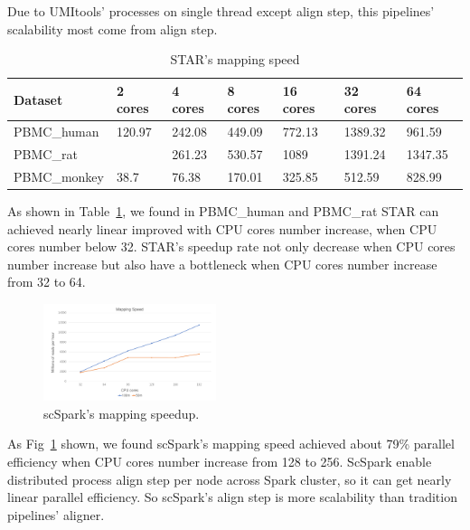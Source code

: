 \documentclass[conference]{IEEEtran}
\begin{document}
Due to UMI\-tools' processes on single thread except align step, this pipelines' scalability most come from align step.
\begin{table}
	\centering
	\caption{STAR's mapping speed}\label{tab3}
	\resizebox{0.45\textwidth}{!} {
	\begin{tabular}{l | l | l | l | l | l | l}
		\hline
		Dataset & 2 cores & 4 cores & 8 cores & 16 cores & 32 cores & 64 cores \\
		\hline
		PBMC\_human & 120.97 & 242.08 & 449.09 & 772.13 & 1389.32 & 961.59 \\
		PBMC\_rat &  & 261.23 & 530.57 & 1089 & 1391.24 & 1347.35 \\
		PBMC\_monkey  & 38.7 & 76.38 & 170.01 & 325.85 & 512.59 & 828.99 \\
		\hline
	\end{tabular} }
\end{table}
As shown in Table~\ref{tab3}, we found in PBMC\_human and PBMC\_rat STAR can achieved nearly linear improved with CPU cores number increase, when CPU cores number below 32.
STAR's speedup rate not only decrease when CPU cores number increase but also have a bottleneck when CPU cores number increase from 32 to 64.
\begin{figure}
	\includegraphics[width=0.45\textwidth]{fig6.pdf}
	\caption{scSpark's mapping speedup.} \label{fig7}
\end{figure}
As Fig~\ref{fig7} shown, we found scSpark's mapping speed achieved about 79\% parallel efficiency when CPU cores number increase from 128 to 256.
ScSpark enable distributed process align step per node across Spark cluster, so it can get nearly linear parallel efficiency.
So scSpark's align step is more scalability than tradition pipelines' aligner. 
\end{document}
